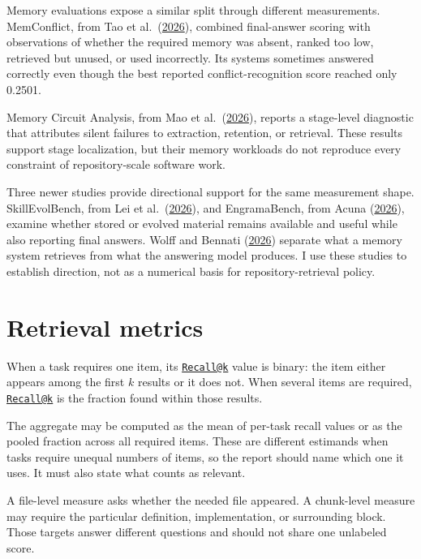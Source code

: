Memory evaluations expose a similar split through different measurements. MemConflict, from Tao et al.~(\href{https://arxiv.org/abs/2605.20926}{2026}), combined final-answer scoring with observations of whether the required memory was absent, ranked too low, retrieved but unused, or used incorrectly. Its systems sometimes answered correctly even though the best reported conflict-recognition score reached only 0.2501.

Memory Circuit Analysis, from Mao et al.~(\href{https://arxiv.org/abs/2605.03354}{2026}), reports a stage-level diagnostic that attributes silent failures to extraction, retention, or retrieval. These results support stage localization, but their memory workloads do not reproduce every constraint of repository-scale software work.

Three newer studies provide directional support for the same measurement shape. SkillEvolBench, from Lei et al.~(\href{https://arxiv.org/abs/2605.24117}{2026}), and EngramaBench, from Acuna (\href{https://arxiv.org/abs/2604.21229}{2026}), examine whether stored or evolved material remains available and useful while also reporting final answers. Wolff and Bennati (\href{https://arxiv.org/abs/2601.07978}{2026}) separate what a memory system retrieves from what the answering model produces. I use these studies to establish direction, not as a numerical basis for repository-retrieval policy.

\section{Retrieval metrics}\label{retrieval-metrics}

When a task requires one item, its \href{mailto:Recall@k}{\nolinkurl{Recall@k}} value is binary: the item either appears among the first \(k\) results or it does not. When several items are required, \href{mailto:Recall@k}{\nolinkurl{Recall@k}} is the fraction found within those results.

The aggregate may be computed as the mean of per-task recall values or as the pooled fraction across all required items. These are different estimands when tasks require unequal numbers of items, so the report should name which one it uses. It must also state what counts as relevant.

A file-level measure asks whether the needed file appeared. A chunk-level measure may require the particular definition, implementation, or surrounding block. Those targets answer different questions and should not share one unlabeled score.

